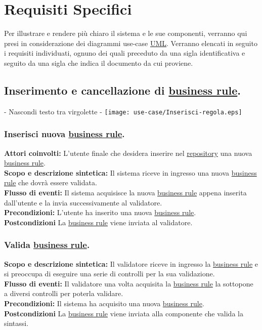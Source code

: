 \chapter{Requisiti Specifici}
Per illustrare e rendere pi\`u chiaro il sistema e le sue componenti, verranno qui presi in considerazione dei diagrammi use-case \underline{UML}. Verranno elencati in seguito i requisiti individuati, ognuno dei quali preceduto da una sigla identificativa e seguito da una sigla che indica il documento da cui proviene.


\section{Inserimento e cancellazione di \underline{business rule}.}
\begin{center}- Nascondi testo tra virgolette -
 \texttt{[image: use-case/Inserisci-regola.eps]}
\end{center}

\subsection{Inserisci nuova \underline{business rule}.}
\textbf{Attori coinvolti:} L'utente finale che desidera inserire nel \underline{repository} una nuova \underline{business rule}.\\
\textbf{Scopo e descrizione sintetica:} Il sistema riceve in ingresso una nuova \underline{business rule} che dovr\`a essere validata.\\
\textbf{Flusso di eventi:} Il sistema acquisisce la nuova \underline{business rule} appena inserita dall'utente e la invia successivamente al validatore.\\
\textbf{Precondizioni:} L'utente ha inserito una nuova \underline{business rule}.\\
\textbf{Postcondizioni} La \underline{business rule} viene inviata al validatore.

\subsection{Valida \underline{business rule}.}
\textbf{Scopo e descrizione sintetica:} Il validatore riceve in ingresso la \underline{business rule} e si preoccupa di eseguire una serie di controlli per la sua validazione.\\
\textbf{Flusso di eventi:} Il validatore una volta acquisita la \underline{business rule} la sottopone a diversi controlli per poterla validare.\\
\textbf{Precondizioni:} Il sistema ha acquisito una nuova \underline{business rule}.\\
\textbf{Postcondizioni} La \underline{business rule} viene inviata alla componente che valida la sintassi.
 
